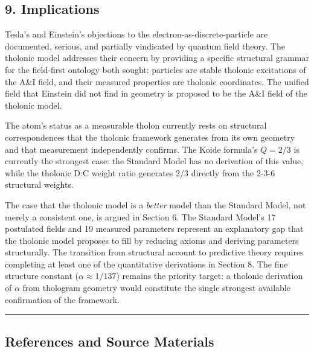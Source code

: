 \documentclass[
  11pt,
  letterpaper,
]{article}
\begin{document}
\subsection{9. Implications}\label{implications}

Tesla's and Einstein's objections to the electron-as-discrete-particle
are documented, serious, and partially vindicated by quantum field
theory. The tholonic model addresses their concern by providing a
specific structural grammar for the field-first ontology both sought:
particles are stable tholonic excitations of the A\&I field, and their
measured properties are tholonic coordinates. The unified field that
Einstein did not find in geometry is proposed to be the A\&I field of
the tholonic model.

The atom's status as a measurable tholon currently rests on structural
correspondences that the tholonic framework generates from its own
geometry and that measurement independently confirms. The Koide
formula's \(Q = 2/3\) is currently the strongest case: the Standard
Model has no derivation of this value, while the tholonic D:C weight
ratio generates 2/3 directly from the 2-3-6 structural weights.

The case that the tholonic model is a \emph{better} model than the
Standard Model, not merely a consistent one, is argued in Section 6. The
Standard Model's 17 postulated fields and 19 measured parameters
represent an explanatory gap that the tholonic model proposes to fill by
reducing axioms and deriving parameters structurally. The transition
from structural account to predictive theory requires completing at
least one of the quantitative derivations in Section 8. The fine
structure constant (\(\alpha \approx 1/137\)) remains the priority
target: a tholonic derivation of \(\alpha\) from thologram geometry
would constitute the single strongest available confirmation of the
framework.

\begin{center}\rule{0.5\linewidth}{0.5pt}\end{center}

\subsection{References and Source
Materials}\label{references-and-source-materials}
\end{document}
